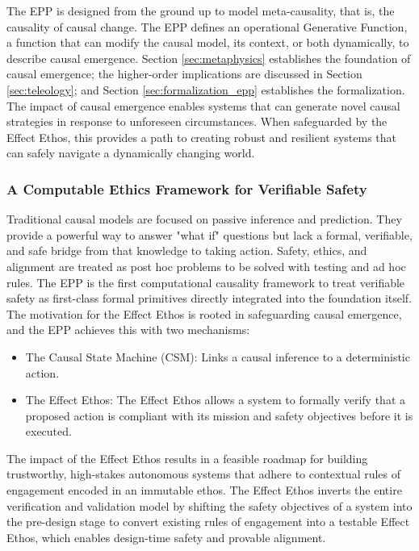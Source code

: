 The EPP is designed from the ground up to model meta-causality, that is, the causality of causal change. The EPP defines an operational Generative Function, a function that can modify the causal model, its context, or both dynamically, to describe causal emergence. Section \ref{sec:metaphysics} establishes the foundation of causal emergence; the higher-order implications are discussed in Section \ref{sec:teleology}; and Section \ref{sec:formalization_epp} establishes the formalization. The impact of causal emergence enables systems that can generate novel causal strategies in response to unforeseen circumstances. When safeguarded by the Effect Ethos, this provides a path to creating robust and resilient systems that can safely navigate a dynamically changing world.

\subsubsection{A Computable Ethics Framework for Verifiable Safety}

Traditional causal models are focused on passive inference and prediction. They provide a powerful way to answer "what if" questions but lack a formal, verifiable, and safe bridge from that knowledge to taking action. Safety, ethics, and alignment are treated as post hoc problems to be solved with testing and ad hoc rules. The EPP is the first computational causality framework to treat verifiable safety as first-class formal primitives directly integrated into the foundation itself. The motivation for the Effect Ethos is rooted in safeguarding causal emergence, and the EPP achieves this with two mechanisms:

\begin{itemize}
    \item The Causal State Machine (CSM): Links a causal inference to a deterministic action.
    \item The Effect Ethos: The Effect Ethos allows a system to formally verify that a proposed action is compliant with its mission and safety objectives before it is executed.
\end{itemize}

The impact of the Effect Ethos results in a feasible roadmap for building trustworthy, high-stakes autonomous systems that adhere to contextual rules of engagement encoded in an immutable ethos. The Effect Ethos inverts the entire verification and validation model by shifting the safety objectives of a system into the pre-design stage to convert existing rules of engagement into a testable Effect Ethos, which enables design-time safety and provable alignment.

